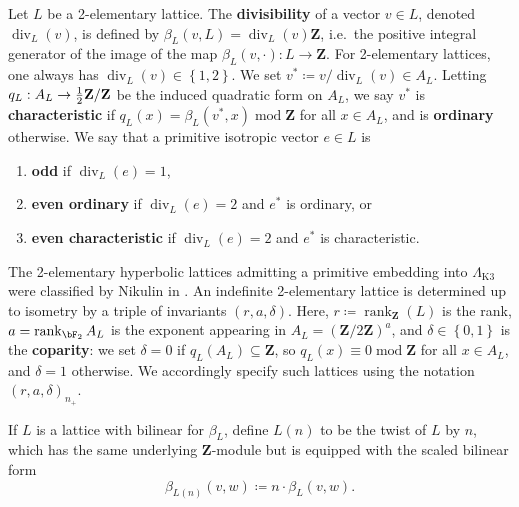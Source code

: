 \documentclass{amsart}
\begin{document}
\begin{remark}

Let \(L\) be a 2-elementary lattice. The \textbf{divisibility} of a vector \(v\in L\), denoted \(\operatorname{div}_L(v)\), is defined by \(\beta_L(v, L) = \operatorname{div}_L(v){\mathbf{Z}}\), i.e.~the positive integral generator of the image of the map \(\beta_L(v, \cdot): L\to {\mathbf{Z}}\). For 2-elementary lattices, one always has \(\operatorname{div}_L(v) \in \left\{{1, 2}\right\}\). We set \(v^* \coloneqq v/\operatorname{div}_L(v)\in A_L\). Letting \(q_L:A_L \to {1\over 2}{\mathbf{Z}}/{\mathbf{Z}}\) be the induced quadratic form on \(A_L\), we say \(v^*\) is \textbf{characteristic} if \(q_L(x) = \beta_L(v^*, x)\operatorname{mod}{\mathbf{Z}}\) for all \(x\in A_L\), and is \textbf{ordinary} otherwise. We say that a primitive isotropic vector \(e\in L\) is

\begin{enumerate}
\def\labelenumi{\arabic{enumi}.}
\item
  \textbf{odd} if \(\operatorname{div}_L(e) = 1\),
\item
  \textbf{even ordinary} if \(\operatorname{div}_L(e) = 2\) and \(e^*\) is ordinary, or
\item
  \textbf{even characteristic} if \(\operatorname{div}_L(e) = 2\) and \(e^*\) is characteristic.
\end{enumerate}

The 2-elementary hyperbolic lattices admitting a primitive embedding into \(\Lambda_{\mathrm{K3}}\) were classified by Nikulin in \cite[\S 3.6.2]{nikulin1979integer-symmetric}. An indefinite 2-elementary lattice is determined up to isometry by a triple of invariants \((r,a,\delta)\). Here, \(r\coloneqq\operatorname{rank}_{\mathbf{Z}}(L)\) is the rank, \(a = \operatorname{rank}_{\bF_2}A_L\) is the exponent appearing in \(A_L = ({\mathbf{Z}}/2{\mathbf{Z}})^a\), and \(\delta \in \left\{{0, 1}\right\}\) is the \textbf{coparity}: we set \(\delta = 0\) if \(q_L(A_L) \subseteq {\mathbf{Z}}\), so \(q_L(x) \equiv 0 \operatorname{mod}{\mathbf{Z}}\) for all \(x\in A_L\), and \(\delta=1\) otherwise. We accordingly specify such lattices using the notation \((r,a,\delta)_{n_+}\).

\end{remark}

\begin{remark}

If \(L\) is a lattice with bilinear for \(\beta_L\), define \(L(n)\) to be the twist of \(L\) by \(n\), which has the same underlying \({\mathbf{Z}}\)-module but is equipped with the scaled bilinear form \[\beta_{L(n)}(v,w) \coloneqq n\cdot \beta_L(v, w).\]

\end{remark}
\end{document}
